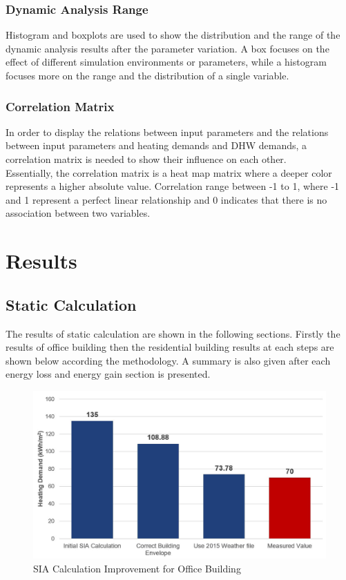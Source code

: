 \documentclass[a4paper, oneside]{discothesis}
\begin{document}
		\subsection{Dynamic Analysis Range}
			Histogram and boxplots are used to show the distribution and the range of the dynamic analysis results after the parameter variation. A box focuses on the effect of different simulation environments or parameters, while a histogram focuses more on the range and the distribution of a single variable.

		\subsection{Correlation Matrix}
			In order to display the relations between input parameters and the relations between input parameters and heating demands and DHW demands, a correlation matrix is needed to show their influence on each other. \\
			Essentially, the correlation matrix is a heat map matrix where a deeper color represents a higher absolute value. Correlation range between -1 to 1, where -1 and 1 represent a perfect linear relationship and 0 indicates that there is no association between two variables.\\
		

\chapter{Results}

	\section{Static Calculation}
		The results of static calculation are shown in the following sections. Firstly the results of office building then the residential building results at each steps are shown below according the methodology. A summary is also given after each energy loss and energy gain section is presented.

		\begin{figure}[htbp]
		\centering
		\includegraphics[scale=0.46]{Office_SIA.jpg}
		\caption{SIA Calculation Improvement for Office Building}
		\label{fig:Sumatra_SIA}
		\end{figure}
		
\end{document}
